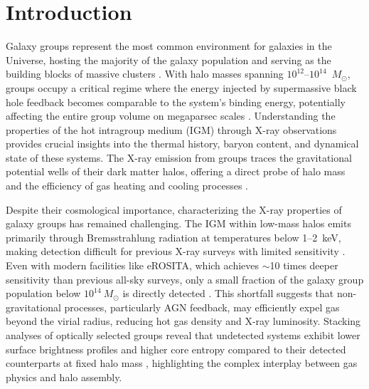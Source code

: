 \documentclass{aa}
\begin{document}

\section{Introduction}

Galaxy groups represent the most common environment for galaxies in the Universe, hosting the majority of the galaxy population and serving as the building blocks of massive clusters \citep{White1978, Springel2005}. With halo masses spanning $10^{12}$--$10^{14}$~$M_{\odot}$, groups occupy a critical regime where the energy injected by supermassive black hole feedback becomes comparable to the system's binding energy, potentially affecting the entire group volume on megaparsec scales \citep{Popesso2024}. Understanding the properties of the hot intragroup medium (IGM) through X-ray observations provides crucial insights into the thermal history, baryon content, and dynamical state of these systems. The X-ray emission from groups traces the gravitational potential wells of their dark matter halos, offering a direct probe of halo mass and the efficiency of gas heating and cooling processes \citep{Finoguenov2007,George2011}.

Despite their cosmological importance, characterizing the X-ray properties of galaxy groups has remained challenging. The IGM within low-mass halos emits primarily through Bremsstrahlung radiation at temperatures below 1--2~keV, making detection difficult for previous X-ray surveys with limited sensitivity \citep{Ponman1996, Mulchaey2000,Osmond2004,Sun2009,Lovisari2015}. Even with modern facilities like eROSITA, which achieves $\sim$10 times deeper sensitivity than previous all-sky surveys, only a small fraction of the galaxy group population below $10^{14}~M_{\odot}$ is directly detected \citep{Popesso2024}. This shortfall suggests that non-gravitational processes, particularly AGN feedback, may efficiently expel gas beyond the virial radius, reducing hot gas density and X-ray luminosity. Stacking analyses of optically selected groups reveal that undetected systems exhibit lower surface brightness profiles and higher core entropy compared to their detected counterparts at fixed halo mass \citep{Popesso2024,Marini2024}, highlighting the complex interplay between gas physics and halo assembly.
\end{document}
